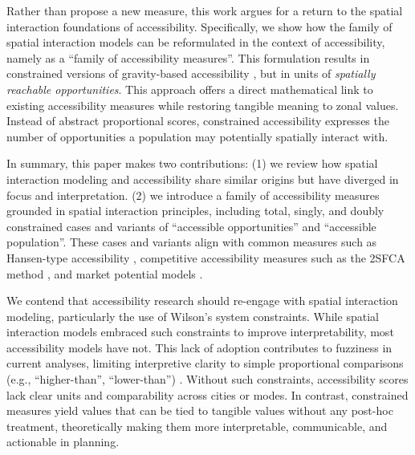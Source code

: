 \documentclass[
  10pt,
  letterpaper,
]{article}
\begin{document}
Rather than propose a new measure, this work argues for a return to the
spatial interaction foundations of accessibility. Specifically, we show
how the family of spatial interaction models \citep{wilson1971} can be
reformulated in the context of accessibility, namely as a ``family of
accessibility measures''. This formulation results in constrained
versions of gravity-based accessibility \citep[e.g.,][]{hansen1959}, but
in units of \emph{spatially reachable opportunities}. This approach
offers a direct mathematical link to existing accessibility measures
while restoring tangible meaning to zonal values. Instead of abstract
proportional scores, constrained accessibility expresses the number of
opportunities a population may potentially spatially interact with.

In summary, this paper makes two contributions: (1) we review how
spatial interaction modeling and accessibility share similar origins but
have diverged in focus and interpretation. (2) we introduce a family of
accessibility measures grounded in spatial interaction principles,
including total, singly, and doubly constrained cases and variants of
``accessible opportunities'' and ``accessible population''. These cases
and variants align with common measures such as Hansen-type
accessibility \citep{hansen1959}, competitive accessibility measures
such as the 2SFCA method \citep{shen1998, luo2003}, and market potential
models
\citep{harris_market_1954, vickermanAccessibilityAttractionPotential1974}.

We contend that accessibility research should re-engage with spatial
interaction modeling, particularly the use of Wilson's
\citep{wilson1971} system constraints. While spatial interaction models
embraced such constraints to improve interpretability, most
accessibility models have not. This lack of adoption contributes to
fuzziness in current analyses, limiting interpretive clarity to simple
proportional comparisons (e.g., ``higher-than'', ``lower-than'')
\citep{millerAccessibilityMeasurementApplication2018}. Without such
constraints, accessibility scores lack clear units and comparability
across cities or modes. In contrast, constrained measures yield values
that can be tied to tangible values without any post-hoc treatment,
theoretically making them more interpretable, communicable, and
actionable in planning.
\end{document}
